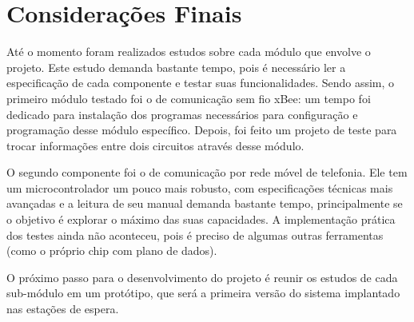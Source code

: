 \documentclass[12pt]{uftpibicsic2020}
\begin{document}
\chapter{Considerações Finais}\vskip -12pt

Até o momento foram realizados estudos sobre cada módulo que envolve o projeto. Este estudo demanda bastante tempo, pois é necessário ler a especificação de cada componente e testar suas funcionalidades. Sendo assim, o primeiro módulo testado foi o de comunicação sem fio xBee: um tempo foi dedicado para instalação dos programas necessários para configuração e programação desse módulo específico. Depois, foi feito um projeto de teste para trocar informações entre dois circuitos através desse módulo.

O segundo componente foi o de comunicação por rede móvel de telefonia. Ele tem um microcontrolador um pouco mais robusto, com especificações técnicas mais avançadas e a leitura de seu manual demanda bastante tempo, principalmente se o objetivo é explorar o máximo das suas capacidades. A implementação prática dos testes ainda não aconteceu, pois é preciso de algumas outras ferramentas (como o próprio chip com plano de dados).



O próximo passo para o desenvolvimento do projeto é reunir os estudos de cada sub-módulo em um protótipo, que será a primeira versão do sistema implantado nas estações de espera.


\end{document}
